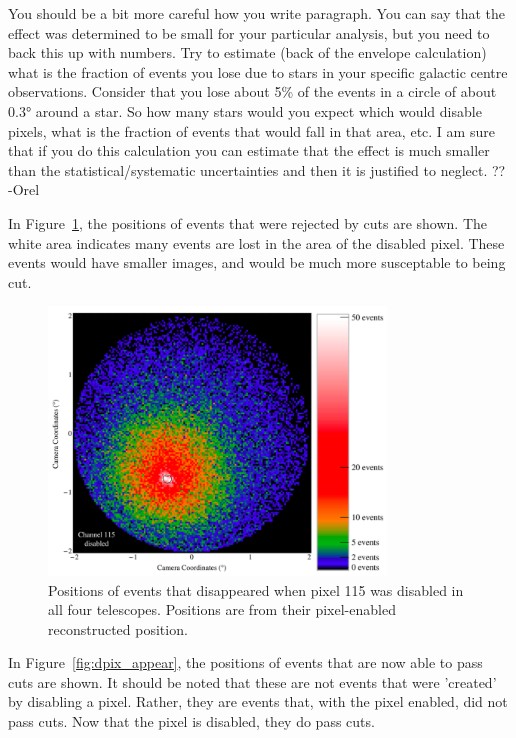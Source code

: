     {\color{red}You should be a bit more careful how you write paragraph. You can say that the effect was determined to be small for your particular analysis, but you need to back this up with numbers. 
Try to estimate (back of the envelope calculation) what is the fraction of events you lose due to stars in your specific galactic centre observations. Consider that you lose about 5\% of the events in a circle of about \ang{0.3} around a star. So how many stars would you expect which would disable pixels, what is the fraction of events that would fall in that area, etc. 
I am sure that if you do this calculation you can estimate that the effect is much smaller than the statistical/systematic uncertainties and then it is justified to neglect. ?? -Orel}

    In Figure~\ref{fig:dpix_disappear}, the positions of events that were rejected by cuts are shown.
    The white area indicates many events are lost in the area of the disabled pixel.
    These events would have smaller images, and would be much more susceptable to being cut.

    \begin{figure}[ht]
      \centering
      \includegraphics[width=0.8\textwidth]{images/disabled_pixel/disappearing_events}
      \caption[Disappearing Events]{
        Positions of events that disappeared when pixel 115 was disabled in all four telescopes.
        Positions are from their pixel-enabled reconstructed position.
      }
      \label{fig:dpix_disappear}
    \end{figure}

    In Figure~\ref{fig:dpix_appear}, the positions of events that are now able to pass cuts are shown.
    It should be noted that these are not events that were 'created' by disabling a pixel.
    Rather, they are events that, with the pixel enabled, did not pass cuts.
    Now that the pixel is disabled, they do pass cuts.

